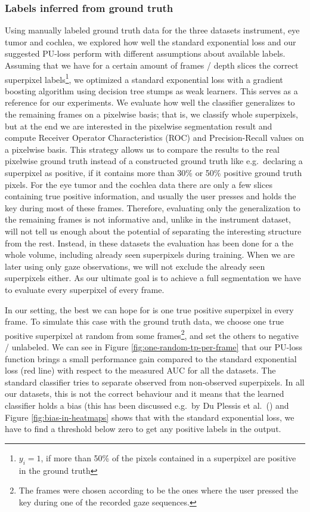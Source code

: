 \subsubsection*{Labels inferred from ground truth}
Using manually labeled ground truth data for the three datasets instrument, eye tumor and cochlea, we explored how well the standard exponential loss and our suggested PU-loss perform with different assumptions about available labels. 
Assuming that we have for a certain amount of frames / depth slices the correct superpixel labels\footnote{$y_i = 1$, if more than 50\% of the pixels contained in a superpixel are positive in the ground truth}, we optimized a standard exponential loss with a gradient boosting algorithm using decision tree stumps as weak learners. 
This serves as a reference for our experiments.
We evaluate how well the classifier generalizes to the remaining frames on a pixelwise basis; that is, we classify whole superpixels, but at the end we are interested in the pixelwise segmentation result and compute Receiver Operator Characteristics (ROC) and Precision-Recall values on a pixelwise basis. 
This strategy allows us to compare the results to the real pixelwise ground truth instead of a constructed ground truth like e.g.\ declaring a superpixel as positive, if it contains more than 30\% or 50\% positive ground truth pixels.
For the eye tumor and the cochlea data there are only a few slices containing true positive information, and usually the user presses and holds the key during most of these frames. 
Therefore, evaluating only the generalization to the remaining frames is not informative and, unlike in the instrument dataset, will not tell us enough about the potential of separating the interesting structure from the rest. 
Instead, in these datasets the evaluation has been done for a the whole volume, including already seen superpixels during training. 
When we are later using only gaze observations, we will not exclude the already seen superpixels either. As our ultimate goal is to achieve a full segmentation we have to evaluate every superpixel of every frame.

In our setting, the best we can hope for is one true positive superpixel in every frame. 
To simulate this case with the ground truth data, we choose one true positive superpixel at random from some frames\footnote{The frames were chosen according to be the ones where the user pressed the key during one of the recorded gaze sequences.}, and set the others to negative / unlabeled. We can see in Figure \ref{fig:one-random-tp-per-frame} that our PU-loss function brings a small performance gain compared to the standard exponential loss (red line) with respect to the measured AUC for all the datasets. 
The standard classifier tries to separate observed from non-observed superpixels. In all our datasets, this is not the correct behaviour and it means that the learned classifier holds a bias (this has been discussed e.g.\ by Du Plessis et al.\ (\cite{plessis2014PUanalysis}) and Figure \ref{fig:bias-in-heatmaps} shows that with the standard exponential loss, we have to find a threshold below zero to get any positive labels in the output. 

